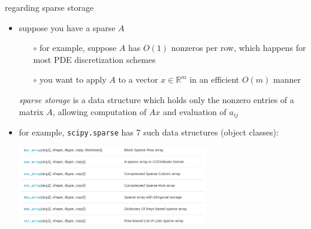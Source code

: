 \documentclass[10pt,
               svgnames,
               hyperref={colorlinks,citecolor=DeepPink4,linkcolor=FireBrick,urlcolor=Maroon},
               usepdftitle=false]{beamer}
\newcommand{\RR}{\mathbb{R}}
\begin{document}
\begin{frame}{regarding sparse storage}

\begin{itemize}
\item suppose you have a sparse $A$
   \begin{itemize}
   \item[$\circ$] for example, suppose $A$ has $O(1)$ nonzeros per row, which happens for most PDE discretization schemes
   \item[$\circ$] you want to apply $A$ to a vector $x\in\RR^m$ in an efficient $O(m)$ manner
   \end{itemize}

\begin{definition}
\emph{sparse storage} is a data structure which holds only the nonzero entries of a matrix $A$, allowing computation of $Ax$ and evaluation of $a_{ij}$
\end{definition}   

\item for example, \texttt{scipy.sparse} has 7 such data structures (object classes):

\medskip
\begin{center}
\includegraphics[width=0.65\textwidth]{images/scipysparse.png}
\end{center}
\end{itemize}
\end{frame}
\end{document}
